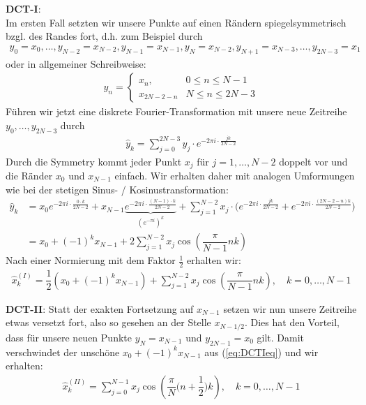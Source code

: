 \textbf{DCT-I}: \\
Im ersten Fall setzten wir unsere Punkte auf einen Rändern spiegelsymmetrisch bzgl. des Randes fort, d.h. 
zum Beispiel durch 
%
\begin{align*}
  y_0 = x_0, 
  \dots, 
  y_{N-2} = x_{N-2}, 
  y_{N-1} = x_{N-1},
  y_N = x_{N-2}, 
  y_{N+1} = x_{N-3}, 
  \dots, 
  y_{2N-3} = x_1
\end{align*}
%
oder in allgemeiner Schreibweise:
%
\begin{align*}
  y_{n} = \begin{cases}
    x_n, & 0\leq n\leq N-1 \\
    x_{2N-2-n} & N \leq n \leq 2N-3
  \end{cases}
\end{align*}
%
Führen wir jetzt eine \grqq{} diskrete Fourier-Transformation mit unsere neue Zeitreihe 
$y_0,\dots,y_{2N-3}$ durch
%
\begin{align*}
  \hat{y}_{k} 
  = \sum_{j=0}^{2N-3} y_j\cdot e^{-2\pi i\cdot \tfrac{jk}{2N-2}} 
\end{align*}
%
Durch die Symmetry kommt jeder Punkt $x_j$ für $j=1,\dots,N-2$ doppelt vor und die Ränder $x_0$ und $x_{N-1}$ einfach.
Wir erhalten daher mit analogen Umformungen wie bei der stetigen Sinus- / Kosinustransformation:
%
\begin{align*}
  \hat{y}_{k} 
  &= x_0 e^{-2\pi i\cdot \tfrac{0\cdot k}{2N-2}} + x_{N-1} \underbrace{e^{-2\pi i\cdot \tfrac{(N-1)\cdot k}{2N-2}}}_{(e^{-\pi i})^k}
  + \sum_{j=1}^{N-2} x_j\cdot \Big(e^{-2\pi i\cdot \tfrac{jk}{2N-2}} + e^{-2\pi i\cdot \tfrac{(2N-2-n)k}{2N-2}} \Big) \\
  &= x_0 + (-1)^kx_{N-1} + 2\sum_{j=1}^{N-2} x_j \cos\left(\dfrac{\pi}{N-1}nk\right)
\end{align*} 
%
Nach einer Normierung mit dem Faktor $\tfrac{1}{2}$ erhalten wir:
%
\begin{align*}
  \hat{x}^{(I)}_k 
  = \dfrac{1}{2}\left(x_0 + (-1)^kx_{N-1}\right) + \sum_{j=1}^{N-2} x_j \cos\left(\dfrac{\pi}{N-1}nk\right), 
  \quad k=0,\dots,N-1
  \tag{I}\label{eq:DCTIeq}
\end{align*}
%

\textbf{DCT-II}:
Statt der exakten Fortsetzung auf $x_{N-1}$ setzen wir nun unsere Zeitreihe etwas versetzt fort, also so gesehen an 
der Stelle $x_{N-1/2}$. Dies hat den Vorteil, dass für unsere neuen Punkte $y_{N}=x_{N-1}$ und $y_{2N-1}=x_0$ gilt. 
Damit verschwindet der unschöne $x_0 + (-1)^kx_{N-1}$ aus (\ref{eq:DCTIeq}) und wir erhalten:
%
\begin{align*}
  \hat{x}^{(II)}_k 
  = \sum_{j=0}^{N-1} x_j \cos\left(\dfrac{\pi}{N}\Big(n+\dfrac{1}{2}\Big)k\right), 
  \quad k=0,\dots,N-1
  \tag{II}\label{eq:DCTIIeq}
\end{align*}
%

